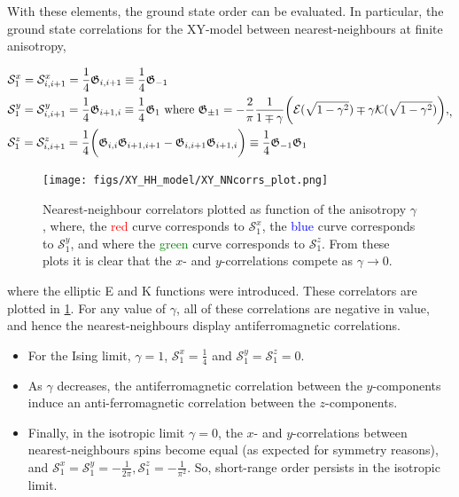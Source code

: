\documentclass{homework}
\begin{document}
With these elements, the ground state order can be evaluated. In particular, the ground state correlations for the XY-model between nearest-neighbours at finite anisotropy, 

\begin{equation}
    \begin{split}
        &\mathcal{S}_1^x = \mathcal{S}^x_{i,i+1} = \frac{1}{4} \mathfrak{G}_{i,i+1} \equiv \frac{1}{4} \mathfrak{G}_{-1} \\
        &\mathcal{S}_1^y = \mathcal{S}^y_{i,i+1} = \frac{1}{4} \mathfrak{G}_{i+1,i} \equiv \frac{1}{4} \mathfrak{G}_{1} \textnormal{ where } \mathfrak{G}_{\pm1} = - \frac{2}{\pi} \frac{1}{1 \mp \gamma} \bigg(\mathcal{E}(\sqrt{1-\gamma^2}) \mp \gamma \mathcal{K}(\sqrt{1-\gamma^2})\bigg), \\
        &\mathcal{S}_1^z = \mathcal{S}^z_{i,i+1} = \frac{1}{4} \bigg(\mathfrak{G}_{i,i}\mathfrak{G}_{i+1,i+1} - \mathfrak{G}_{i,i+1}\mathfrak{G}_{i+1,i} \bigg)\equiv \frac{1}{4} \mathfrak{G}_{-1}\mathfrak{G}_{1}
    \end{split}, 
\end{equation}

\begin{figure}
    \centering
    \texttt{[image: figs/XY\_HH\_model/XY\_NNcorrs\_plot.png]}
    \caption{Nearest-neighbour correlators plotted as function of the anisotropy $\gamma$, where, 
        the \textcolor{red}{red} curve corresponds to $\mathcal{S}_1^x$, 
        the \textcolor{blue}{blue} curve corresponds to $\mathcal{S}_1^y$,
        and where the \textcolor{green}{green} curve corresponds to $\mathcal{S}_1^z$.
    From these plots it is clear that the $x$- and $y$-correlations compete as $\gamma \rightarrow 0. $
    }
    \label{fig:XY_NN_corrs}
\end{figure}

where the elliptic E and K functions were introduced. These correlators are plotted in \cref{fig:XY_NN_corrs}. For any value of $\gamma$, all of these correlations are negative in value, and hence the nearest-neighbours display antiferromagnetic correlations. 

\begin{itemize}
    \item For the Ising limit, $\gamma = 1$, $\mathcal{S}_1^x = \frac{1}{4}$ and $\mathcal{S}_1^y = \mathcal{S}_1^z = 0$. 
    \item As $\gamma$ decreases, the antiferromagnetic correlation between the $y$-components induce an anti-ferromagnetic correlation between the $z$-components. 
    \item Finally, in the isotropic limit $\gamma=0$, the $x$- and $y$-correlations between nearest-neighbours spins become equal (as expected for symmetry reasons), and $\mathcal{S}_1^x = \mathcal{S}_1^y = -\frac{1}{2\pi}, \mathcal{S}_1^z = - \frac{1}{\pi^2}$. So, short-range order persists in the isotropic limit.
\end{itemize}
\end{document}
